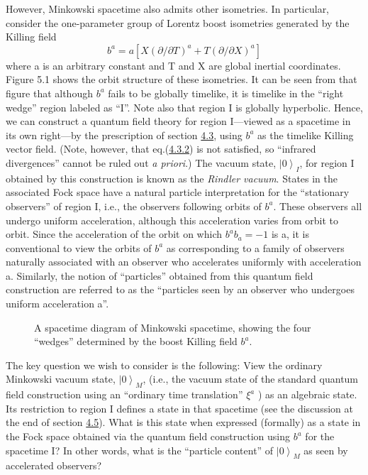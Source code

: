 \documentclass[11pt,a4paper]{article}
\providecommand{\ket}[1]{\left\lvert#1\right\rangle}
\begin{document}
However, Minkowski spacetime also admits other isometries. In particular, consider the one-parameter group of Lorentz boost isometries generated by the Killing field
\begin{equation*}
b^{a} = a[X(\partial/\partial T)^{a} + T(\partial/\partial X)^{a}] \tag{5.1.1}\label{eq:5.1.1}
\end{equation*}
where a is an arbitrary constant and T and X are global inertial coordinates. Figure 5.1 shows the orbit structure of these isometries. It can be seen from that figure that although \(b^a\) fails to be globally timelike, it is timelike in the ``right wedge'' region labeled as ``I''. Note also that region I is globally hyperbolic. Hence, we can construct a quantum field theory for region I---viewed as a spacetime in its own right---by the prescription of section \hyperlink{sec:4.3}{4.3}, using \(b^a\) as the timelike Killing vector field. (Note, however, that eq.(\hyperref[eq:4.3.2]{4.3.2}) is not \hypertarget{source-120}{} satisfied, so ``infrared divergences'' cannot be ruled out \emph{a priori}.) The vacuum state, \(\ket{0}_I\), for region I obtained by this construction is known as the \emph{Rindler vacuum}. States in the associated Fock space have a natural particle interpretation for the ``stationary observers'' of region I, i.e., the observers following orbits of \(b^a\). These observers all undergo uniform acceleration, although this acceleration varies from orbit to orbit. Since the acceleration of the orbit on which \(b^ab_a = -1\) is a, it is conventional to view the orbits of \(b^a\) as corresponding to a family of observers naturally associated with an observer who accelerates uniformly with acceleration a. Similarly, the notion of ``particles'' obtained from this quantum field construction are referred to as the ``particles seen by an observer who undergoes uniform acceleration a''.

\begin{figure}[htbp]
\centering
\renewcommand{\thefigure}{5.1}

\caption{A spacetime diagram of Minkowski spacetime, showing the four ``wedges'' determined by the boost Killing field \(b^a\).}\label{fig:5.1}
\end{figure}

The key question we wish to consider is the following: View the ordinary Minkowski vacuum state, \(\ket{0}_M\), (i.e., the vacuum state of the standard quantum field construction using an ``ordinary time translation'' \(\xi^a\) ) as an algebraic state. Its restriction to region I defines a state in that spacetime (see the discussion at the end of section \hyperlink{sec:4.5}{4.5}). What is this state when expressed (formally) as a state in the Fock space obtained via the quantum field construction using \(b^a\) for the spacetime I? In other words, what is the ``particle content'' of \(\ket{0}_M\) as seen by accelerated observers?
\end{document}
